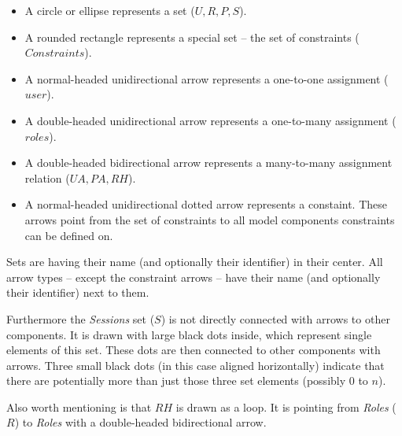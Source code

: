 \documentclass[twoside, openright, 12pt]{book}
\begin{document}
\begin{itemize}
\item A circle or ellipse represents a set ($U, R, P, S$).
\item A rounded rectangle represents a special set -- the set of constraints ($Constraints$).
\item A normal-headed unidirectional arrow represents a one-to-one assignment ($user$).
\item A double-headed unidirectional arrow represents a one-to-many assignment ($roles$).
\item A double-headed bidirectional arrow represents a many-to-many assignment relation ($UA, PA, RH$).
\item A normal-headed unidirectional dotted arrow represents a constaint.
These arrows point from the set of constraints to all model components constraints can be defined on.
\end{itemize}

\noindent
Sets are having their name (and optionally their identifier) in their center.
All arrow types -- except the constraint arrows -- have their name (and optionally their identifier) next to them.

Furthermore the \textit{Sessions} set ($S$) is not directly connected with arrows to other components.
It is drawn with large black dots inside, which represent single elements of this set.
These dots are then connected to other components with arrows.
Three small black dots (in this case aligned horizontally) indicate that there are potentially more than just those three set elements (possibly $0$ to $n$).

Also worth mentioning is that $RH$ is drawn as a loop. 
It is pointing from \textit{Roles} ($R$) to \textit{Roles} with a double-headed bidirectional arrow.



\end{document}
